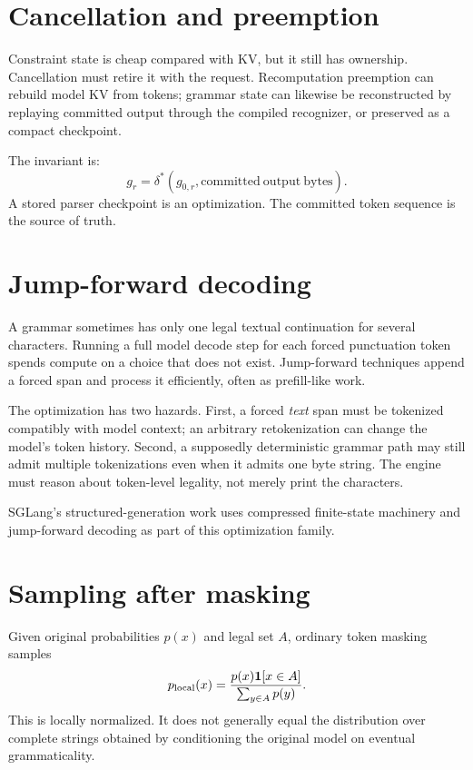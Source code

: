\section{Cancellation and preemption}

Constraint state is cheap compared with KV, but it still has ownership. Cancellation
must retire it with the request. Recomputation preemption can rebuild model KV from
tokens; grammar state can likewise be reconstructed by replaying committed output
through the compiled recognizer, or preserved as a compact checkpoint.

The invariant is:
\[
g_r=\delta^*(g_{0,r},\mathrm{committed\ output\ bytes}).
\]
A stored parser checkpoint is an optimization. The committed token sequence is the
source of truth.

\section{Jump-forward decoding}

A grammar sometimes has only one legal textual continuation for several characters.
Running a full model decode step for each forced punctuation token spends compute on a
choice that does not exist. Jump-forward techniques append a forced span and process
it efficiently, often as prefill-like work.

The optimization has two hazards. First, a forced \emph{text} span must be tokenized
compatibly with model context; an arbitrary retokenization can change the model's
token history. Second, a supposedly deterministic grammar path may still admit
multiple tokenizations even when it admits one byte string. The engine must reason
about token-level legality, not merely print the characters.

SGLang's structured-generation work uses compressed finite-state machinery and
jump-forward decoding as part of this optimization family.

\section{Sampling after masking}

Given original probabilities $p(x)$ and legal set $A$, ordinary token masking samples
\[
p_{\rm local}(x)=\frac{p(x)\mathbf{1}[x\in A]}
{\sum_{y\in A}p(y)}.
\]
This is locally normalized. It does not generally equal the distribution over complete
strings obtained by conditioning the original model on eventual grammaticality.

